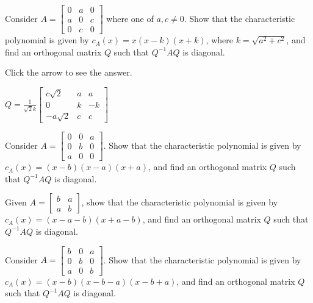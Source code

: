 \documentclass{ximera}
\begin{document}
\begin{problem}\label{prob:ortho11}
Consider $A = \begin{bmatrix}
0 & a & 0 \\
a & 0 & c \\
0 & c & 0
\end{bmatrix}$
 where one of $a, c \neq 0$. Show that the characteristic polynomial is given by $c_{A}(x) = x(x - k)(x + k)$, where $k = \sqrt{a^2 + c^2}$, and find an orthogonal matrix $Q$ such that $Q^{-1}AQ$ is diagonal.

Click the arrow to see the answer.
\begin{expandable}
$Q = \frac{1}{\sqrt{2}k}\begin{bmatrix}
c\sqrt{2} & a & a \\
0 & k & -k \\
-a\sqrt{2} & c & c
\end{bmatrix}$
\end{expandable}
\end{problem}

\begin{problem}\label{prob:ortho12}
Consider $A = \begin{bmatrix}
0 & 0 & a \\
0 & b & 0 \\
a & 0 & 0
\end{bmatrix}$. Show that the characteristic polynomial is given by $c_{A}(x) = (x - b)(x - a)(x + a)$, and find an orthogonal matrix $Q$ such that $Q^{-1}AQ$ is diagonal.
\end{problem}

\begin{problem}\label{prob:ortho13}
Given $A = \begin{bmatrix}
b & a \\
a & b
\end{bmatrix}$, show that the characteristic polynomial is given by $c_{A}(x) = (x - a - b)(x + a - b)$, and find an orthogonal matrix $Q$ such that $Q^{-1}AQ$ is diagonal.
\end{problem}

\begin{problem}\label{prob:ortho14}
Consider $A = \begin{bmatrix}
b & 0 & a \\
0 & b & 0 \\
a & 0 & b
\end{bmatrix}$. Show that the characteristic polynomial is given by $c_{A}(x) = (x - b)(x - b - a)(x - b + a)$, and find an orthogonal matrix $Q$ such that $Q^{-1}AQ$ is diagonal.
\end{problem}
\end{document}
